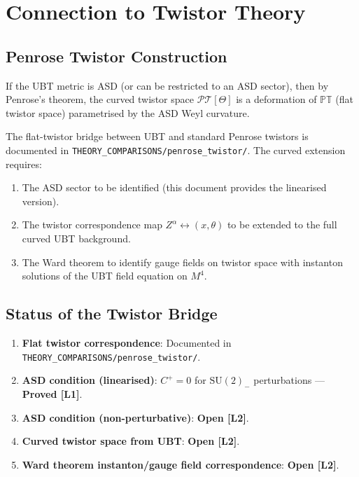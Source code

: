 \documentclass[11pt,a4paper]{article}
\theoremstyle{definition}
\theoremstyle{remark}
\begin{document}
\section{Connection to Twistor Theory}
\label{sec:twistor}

\subsection{Penrose Twistor Construction}

If the UBT metric is ASD (or can be restricted to an ASD sector), then
by Penrose's theorem, the curved twistor space $\mathcal{PT}[\Theta]$ is
a deformation of $\mathbb{PT}$ (flat twistor space) parametrised by the
ASD Weyl curvature.

The flat-twistor bridge between UBT and standard Penrose twistors is
documented in \texttt{THEORY\_COMPARISONS/penrose\_twistor/}.  The
curved extension requires:

\begin{enumerate}
  \item The ASD sector to be identified (this document provides the
        linearised version).
  \item The twistor correspondence map $Z^\alpha \leftrightarrow (x,\theta)$
        to be extended to the full curved UBT background.
  \item The Ward theorem to identify gauge fields on twistor space with
        instanton solutions of the UBT field equation on $M^4$.
\end{enumerate}

\subsection{Status of the Twistor Bridge}

\begin{tcolorbox}[colback=blue!5!white,colframe=blue!75!black,
                  title={Summary: Twistor Bridge Status}]
\begin{enumerate}
  \item \textbf{Flat twistor correspondence}: Documented in
        \texttt{THEORY\_COMPARISONS/penrose\_twistor/}.
  \item \textbf{ASD condition (linearised)}: $C^+ = 0$ for
        $\mathrm{SU}(2)_-$ perturbations — \textbf{Proved [L1]}.
  \item \textbf{ASD condition (non-perturbative)}: \textbf{Open [L2]}.
  \item \textbf{Curved twistor space from UBT}: \textbf{Open [L2]}.
  \item \textbf{Ward theorem instanton/gauge field correspondence}:
        \textbf{Open [L2]}.
\end{enumerate}
\end{tcolorbox}
\end{document}
